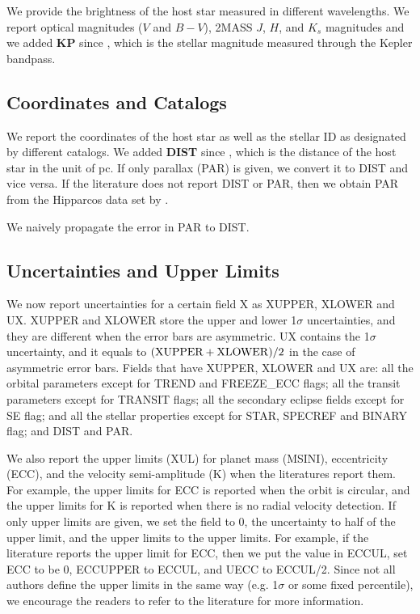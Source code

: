 \documentclass[11pt,preprint]{aastex}
\begin{document}
\begin{CJK*}{UTF8}{gbsn}
We provide the brightness of the host star measured in different
wavelengths. We report optical magnitudes ($V$ and $B-V$), 2MASS $J$,
$H$, and $K_s$ magnitudes and we added {\bf KP} since
\cite{Wright2011}, which is the stellar magnitude measured through the
Kepler bandpass.


\subsection{Coordinates and Catalogs}\label{sec:coord}
We report the coordinates of the host star as well as the stellar ID
as designated by different catalogs.  We added {\bf DIST} since
\cite{Wright2011}, which is the distance of the host star in the unit
of pc. If only parallax (PAR) is given, we convert it to DIST and vice
versa. If the literature does not report DIST or PAR, then we obtain
PAR from the Hipparcos data set by \cite{van Leeuwen2009}.

We naively propagate the error in PAR to DIST. 

\subsection{Uncertainties and Upper Limits}\label{sec:unc}

We now report uncertainties for a certain field X as XUPPER, XLOWER
and UX. XUPPER and XLOWER store the upper and lower 1$\sigma$
uncertainties, and they are different when the error bars are
asymmetric. UX contains the 1$\sigma$ uncertainty, and it equals to
$({\rm XUPPER+XLOWER})/2$ in the case of asymmetric error bars. Fields
that have XUPPER, XLOWER and UX are: all the orbital parameters except
for TREND and FREEZE\_ECC flags; all the transit parameters except for
TRANSIT flags; all the secondary eclipse fields except for SE flag;
and all the stellar properties except for STAR, SPECREF and BINARY
flag; and DIST and PAR.

We also report the upper limits (XUL) for planet mass (MSINI),
eccentricity (ECC), and the velocity semi-amplitude (K) when the
literatures report them. For example, the upper limits for ECC is
reported when the orbit is circular, and the upper limits for K is
reported when there is no radial velocity detection. If only upper
limits are given, we set the field to 0, the uncertainty to half of
the upper limit, and the upper limits to the upper limits. For
example, if the literature reports the upper limit for ECC, then we
put the value in ECCUL, set ECC to be 0, ECCUPPER to ECCUL, and UECC
to ECCUL/2. Since not all authors define the upper limits in the same
way (e.g. 1$\sigma$ or some fixed percentile), we encourage the
readers to refer to the literature for more information.


\end{CJK*}
\end{document}

